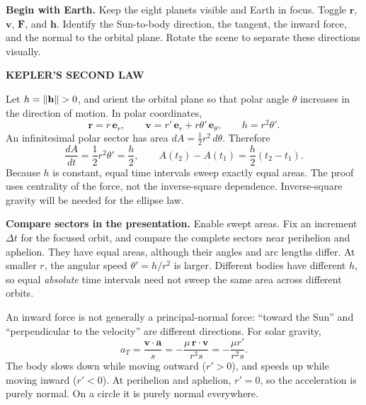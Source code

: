 \documentclass[11pt,letterpaper]{article}
\newcommand{\R}{\mathbf r}\newcommand{\V}{\mathbf v}\newcommand{\A}{\mathbf a}
\newcommand{\F}{\mathbf F}\newcommand{\HH}{\mathbf h}\newcommand{\X}{\mathbf x}
\newcommand{\heading}[1]{\vspace{3pt}{\large\bfseries #1}\par}
\newcommand{\subhead}[1]{\textbf{#1}\quad}
\newcommand{\tagline}[1]{{\small\bfseries\color{inkblue}#1}\par}
\begin{document}
\subhead{Begin with Earth.} Keep the eight planets visible and Earth in focus. Toggle $\R$, $\V$, $\F$, and $\HH$. Identify the Sun-to-body direction, the tangent, the inward force, and the normal to the orbital plane. Rotate the scene to separate these directions visually.

\newpage
\tagline{KEPLER'S SECOND LAW}
\heading{Equal time, equal swept area}
Let $h=\norm{\HH}>0$, and orient the orbital plane so that polar angle $\theta$ increases in the direction of motion. In polar coordinates,
\[
 \R=r\,\mathbf e_r,\qquad
 \V=r'\,\mathbf e_r+r\theta'\,\mathbf e_\theta,
 \qquad h=r^2\theta'.
\]
An infinitesimal polar sector has area $dA=\tfrac12r^2\,d\theta$. Therefore
\[
 \boxed{\frac{dA}{dt}=\frac12r^2\theta'=\frac h2,\qquad
 A(t_2)-A(t_1)=\frac h2(t_2-t_1).}
\]
Because $h$ is constant, equal time intervals sweep exactly equal areas. The proof uses centrality of the force, not the inverse-square dependence. Inverse-square gravity will be needed for the ellipse law.

\begin{center}
\end{center}

\subhead{Compare sectors in the presentation.} Enable swept areas. Fix an increment $\Delta t$ for the focused orbit, and compare the complete sectors near perihelion and aphelion. They have equal areas, although their angles and arc lengths differ. At smaller $r$, the angular speed $\theta'=h/r^2$ is larger. Different bodies have different $h$, so equal \emph{absolute} time intervals need not sweep the same area across different orbits.

\heading{Connect this to tangential and normal acceleration}
An inward force is not generally a principal-normal force: ``toward the Sun'' and ``perpendicular to the velocity'' are different directions. For solar gravity,
\[
 a_T=\frac{\V\cdot\A}{s}
 =-\frac{\mu\,\R\cdot\V}{r^3s}
 =-\frac{\mu r'}{r^2s}.
\]
The body slows down while moving outward ($r'>0$), and speeds up while moving inward ($r'<0$). At perihelion and aphelion, $r'=0$, so the acceleration is purely normal. On a circle it is purely normal everywhere.
\end{document}
